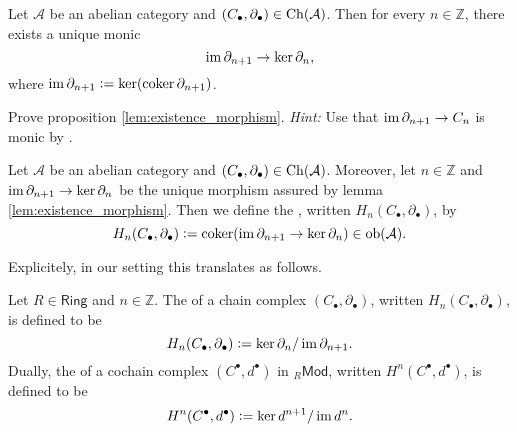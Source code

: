 \begin{proposition}
	\label{lem:existence_morphism}
	Let $\mathcal{A}$ be an abelian category and $(C_\bullet,\partial_\bullet) \in \operatorname{Ch}(\mathcal{A})$. Then for every $n \in \mathbb{Z}$, there exists a unique monic 
	\begin{equation*}
		\operatorname{im} \partial_{n + 1} \to \ker \partial_n,
	\end{equation*}
	\noindent where $\operatorname{im} \partial_{n + 1} := \ker(\operatorname{coker} \partial_{n + 1})$.
\end{proposition}

\begin{exercise}
	Prove proposition \ref{lem:existence_morphism}. \emph{Hint:} Use that $\operatorname{im} \partial_{n + 1} \to C_n$ is monic by \cite[199]{maclane:categories:1978}.
\end{exercise}

\begin{definition}
	Let $\mathcal{A}$ be an abelian category and $(C_\bullet,\partial_\bullet) \in \operatorname{Ch}(\mathcal{A})$. Moreover, let $n \in \mathbb{Z}$ and $\operatorname{im} \partial_{n + 1} \to \ker \partial_n$ be the unique morphism assured by lemma \ref{lem:existence_morphism}. Then we define the , written $H_n(C_\bullet,\partial_\bullet)$, by
	\begin{equation*}
		H_n(C_\bullet,\partial_\bullet) := \operatorname{coker}(\operatorname{im} \partial_{n + 1} \to \ker \partial_n) \in \operatorname{ob}(\mathcal{A}).
	\end{equation*} 
\end{definition}

Explicitely, in our setting this translates as follows.

\begin{definition} Let $R \in \mathsf{Ring}$ and $n \in \mathbb{Z}$. The  of a chain complex $(C_\bullet,\partial_\bullet)$, written $H_n(C_\bullet,\partial_\bullet)$, is defined to be
	\begin{equation*}
		H_n(C_\bullet,\partial_\bullet) := \ker \partial_n/\operatorname{im} \partial_{n + 1}.
	\end{equation*}
	Dually, the  of a cochain complex $(C^\bullet,d^\bullet)$ in $_{R}\mathsf{Mod}$, written $H^n(C^\bullet,d^\bullet)$, is defined to be
	\begin{equation*}
		H^n(C^\bullet,d^\bullet) := \ker d^{n + 1}/\operatorname{im} d^n. 
	\end{equation*}
\end{definition}

